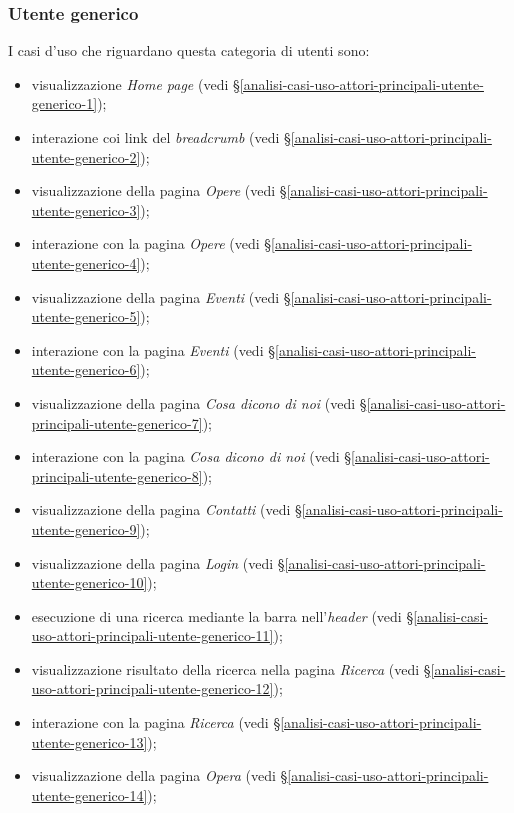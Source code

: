 \subsubsection{Utente generico}
\label{analisi-casi-uso-attori-principali-utente-generico}
I casi d'uso che riguardano questa categoria di utenti sono:
\begin{itemize}
	\item visualizzazione \textit{Home page} (vedi §\ref{analisi-casi-uso-attori-principali-utente-generico-1});
	\item interazione coi link del \textit{breadcrumb} (vedi §\ref{analisi-casi-uso-attori-principali-utente-generico-2});
	\item visualizzazione della pagina \textit{Opere} (vedi §\ref{analisi-casi-uso-attori-principali-utente-generico-3});
	\item interazione con la pagina \textit{Opere} (vedi §\ref{analisi-casi-uso-attori-principali-utente-generico-4});
	\item visualizzazione della pagina \textit{Eventi} (vedi §\ref{analisi-casi-uso-attori-principali-utente-generico-5});
	\item interazione con la pagina \textit{Eventi} (vedi §\ref{analisi-casi-uso-attori-principali-utente-generico-6});
	\item visualizzazione della pagina \textit{Cosa dicono di noi} (vedi §\ref{analisi-casi-uso-attori-principali-utente-generico-7});
	\item interazione con la pagina \textit{Cosa dicono di noi} (vedi §\ref{analisi-casi-uso-attori-principali-utente-generico-8});
	\item visualizzazione della pagina \textit{Contatti} (vedi §\ref{analisi-casi-uso-attori-principali-utente-generico-9});
	\item visualizzazione della pagina \textit{Login} (vedi §\ref{analisi-casi-uso-attori-principali-utente-generico-10});
	\item esecuzione di una ricerca mediante la barra nell'\textit{header} (vedi §\ref{analisi-casi-uso-attori-principali-utente-generico-11});
	\item visualizzazione risultato della ricerca nella pagina \textit{Ricerca} (vedi §\ref{analisi-casi-uso-attori-principali-utente-generico-12});
	\item interazione con la pagina \textit{Ricerca} (vedi §\ref{analisi-casi-uso-attori-principali-utente-generico-13});
	\item visualizzazione della pagina \textit{Opera} (vedi §\ref{analisi-casi-uso-attori-principali-utente-generico-14});

\end{itemize}
